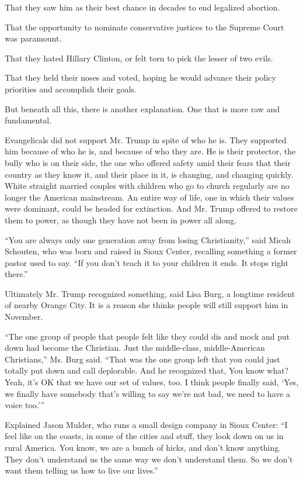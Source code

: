 That they saw him as their best chance in decades to end legalized
abortion.

That the opportunity to nominate conservative justices to the Supreme
Court was paramount.

That they hated Hillary Clinton, or felt torn to pick the lesser of two
evils.

That they held their noses and voted, hoping he would advance their
policy priorities and accomplish their goals.

But beneath all this, there is another explanation. One that is more raw
and fundamental.

Evangelicals did not support Mr. Trump in spite of who he is. They
supported him because of who he is, and because of who they are. He is
their protector, the bully who is on their side, the one who offered
safety amid their fears that their country as they know it, and their
place in it, is changing, and changing quickly. White straight married
couples with children who go to church regularly are no longer the
American mainstream. An entire way of life, one in which their values
were dominant, could be headed for extinction. And Mr. Trump offered to
restore them to power, as though they have not been in power all along.

``You are always only one generation away from losing Christianity,''
said Micah Schouten, who was born and raised in Sioux Center, recalling
something a former pastor used to say. ``If you don't teach it to your
children it ends. It stops right there.''

Ultimately Mr. Trump recognized something, said Lisa Burg, a longtime
resident of nearby Orange City. It is a reason she thinks people will
still support him in November.

``The one group of people that people felt like they could dis and mock
and put down had become the Christian. Just the middle-class,
middle-American Christians,'' Ms. Burg said. ``That was the one group
left that you could just totally put down and call deplorable. And he
recognized that, You know what? Yeah, it's OK that we have our set of
values, too. I think people finally said, `Yes, we finally have somebody
that's willing to say we're not bad, we need to have a voice too.'''

Explained Jason Mulder, who runs a small design company in Sioux Center:
``I feel like on the coasts, in some of the cities and stuff, they look
down on us in rural America. You know, we are a bunch of hicks, and
don't know anything. They don't understand us the same way we don't
understand them. So we don't want them telling us how to live our
lives.''

